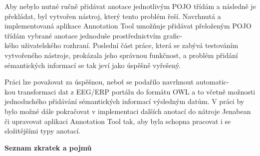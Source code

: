 \documentclass{projekt}
\begin{document}
Aby nebylo nutné ručně přidávat anotace jednotlivým POJO třídám a následně je překládat, 
byl vytvořen nástroj, který tento problém řeší. Navrhnutá a implementovaná aplikace Annotation Tool umožňuje přidávat přeloženým POJO třídám vybrané anotace jednoduše prostřednictvím grafic-\\kého uživatelského rozhraní.
Poslední část práce, která se zabývá testováním vytvořeného nástroje, prokázala jeho správnou funkčnost, a problém přidání sémantických informací se tak jeví jako úspěšně vyřešený.


Práci lze považovat za úspěšnou, neboť se podařilo navrhnout automatic-\\kou transformaci dat z EEG/ERP portálu do formátu OWL a to včetně možnosti jednoduchého přidávání sémantických informací výsledným datům. V práci by bylo možné dále pokračovat v implementaci dalších anotací do nátroje Jenabean či upravovat aplikaci Annotation Tool tak, aby byla schopna pracovat i se složitějšími typy anotací.



\newpage
\thispagestyle{plain}
\noindent
{\bf \LARGE Seznam zkratek a pojmů}\\
\end{document}
